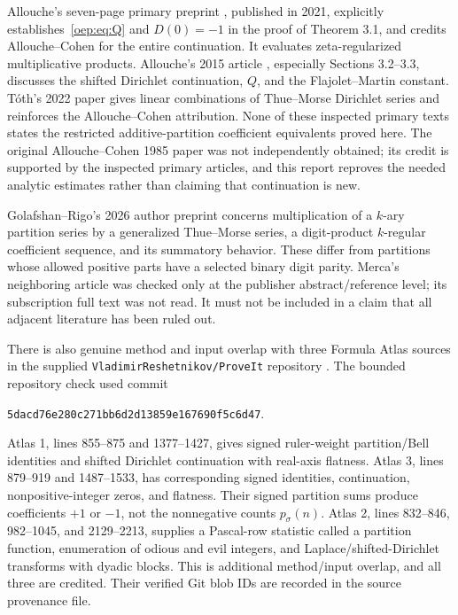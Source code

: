 \documentclass[11pt,letterpaper]{article}
\theoremstyle{remark}\newtheorem{remark}[theorem]{Remark}
\begin{document}
Allouche's seven-page primary preprint \cite{allouche2019}, published in 2021, explicitly establishes~\eqref{oep:eq:Q} and $D(0)=-1$ in the proof of Theorem 3.1, and credits Allouche--Cohen for the entire continuation. It evaluates zeta-regularized multiplicative products. Allouche's 2015 article \cite{allouche2015}, especially Sections 3.2--3.3, discusses the shifted Dirichlet continuation, $Q$, and the Flajolet--Martin constant. T\'oth's 2022 paper \cite{toth} gives linear combinations of Thue--Morse Dirichlet series and reinforces the Allouche--Cohen attribution. None of these inspected primary texts states the restricted additive-partition coefficient equivalents proved here. The original Allouche--Cohen 1985 paper was not independently obtained; its credit is supported by the inspected primary articles, and this report reproves the needed analytic estimates rather than claiming that continuation is new.

Golafshan--Rigo's 2026 author preprint \cite{golafshan} concerns multiplication of a $k$-ary partition series by a generalized Thue--Morse series, a digit-product $k$-regular coefficient sequence, and its summatory behavior. These differ from partitions whose allowed positive parts have a selected binary digit parity. Merca's neighboring article \cite{merca} was checked only at the publisher abstract/reference level; its subscription full text was not read. It must not be included in a claim that all adjacent literature has been ruled out.

There is also genuine method and input overlap with three Formula Atlas sources in the supplied \texttt{VladimirReshetnikov/ProveIt} repository \cite{atlas}. The bounded repository check used commit
\begin{center}\small\texttt{5dacd76e280c271bb6d2d13859e167690f5c6d47}.
\end{center}
Atlas 1, lines 855--875 and 1377--1427, gives signed ruler-weight partition/Bell identities and shifted Dirichlet continuation with real-axis flatness. Atlas 3, lines 879--919 and 1487--1533, has corresponding signed identities, continuation, nonpositive-integer zeros, and flatness. Their signed partition sums produce coefficients $+1$ or $-1$, not the nonnegative counts $p_\sigma(n)$. Atlas 2, lines 832--846, 982--1045, and 2129--2213, supplies a Pascal-row statistic called a partition function, enumeration of odious and evil integers, and Laplace/shifted-Dirichlet transforms with dyadic blocks. This is additional method/input overlap, and all three are credited. Their verified Git blob IDs are recorded in the source provenance file.
\end{document}
